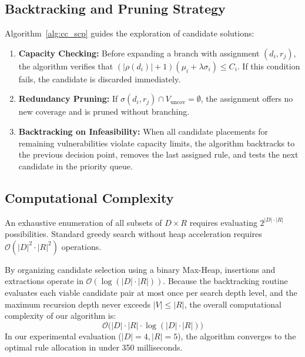 \documentclass[conference]{IEEEtran}
\begin{document}
\subsection{Backtracking and Pruning Strategy}
Algorithm~\ref{alg:cc_scp} guides the exploration of candidate solutions:
\begin{enumerate}
    \item \textbf{Capacity Checking:} Before expanding a branch with assignment $(d_i, r_j)$, the algorithm verifies that $(|\rho(d_i)| + 1)(\mu_i + \lambda\sigma_i) \le C_i$. If this condition fails, the candidate is discarded immediately.
    \item \textbf{Redundancy Pruning:} If $\sigma(d_i, r_j) \cap V_{\text{uncov}} = \emptyset$, the assignment offers no new coverage and is pruned without branching.
    \item \textbf{Backtracking on Infeasibility:} When all candidate placements for remaining vulnerabilities violate capacity limits, the algorithm backtracks to the previous decision point, removes the last assigned rule, and tests the next candidate in the priority queue.
\end{enumerate}

\subsection{Computational Complexity}
An exhaustive enumeration of all subsets of $D \times R$ requires evaluating $2^{|D| \cdot |R|}$ possibilities. Standard greedy search without heap acceleration requires $\mathcal{O}(|D|^2 \cdot |R|^2)$ operations.

By organizing candidate selection using a binary Max-Heap, insertions and extractions operate in $\mathcal{O}(\log(|D| \cdot |R|))$. Because the backtracking routine evaluates each viable candidate pair at most once per search depth level, and the maximum recursion depth never exceeds $|V| \le |R|$, the overall computational complexity of our algorithm is:
\begin{equation}
\mathcal{O}\big( |D| \cdot |R| \cdot \log(|D| \cdot |R|) \big)
\end{equation}
In our experimental evaluation ($|D|=4, |R|=5$), the algorithm converges to the optimal rule allocation in under 350 milliseconds.

\end{document}
